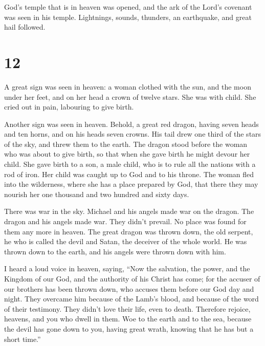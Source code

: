  God's temple that is in heaven was opened, and the ark
of the Lord's covenant was seen in his temple. Lightnings, sounds,
thunders, an earthquake, and great hail followed.

\hypertarget{section-11}{%
\section{12}\label{section-11}}

 A great sign was seen in heaven: a woman clothed with the
sun, and the moon under her feet, and on her head a crown of twelve
stars.  She was with child. She cried out in pain,
labouring to give birth.

 Another sign was seen in heaven. Behold, a great red
dragon, having seven heads and ten horns, and on his heads seven crowns.
 His tail drew one third of the stars of the sky, and
threw them to the earth. The dragon stood before the woman who was about
to give birth, so that when she gave birth he might devour her child.
 She gave birth to a son, a male child, who is to rule all
the nations with a rod of iron. Her child was caught up to God and to
his throne.  The woman fled into the wilderness, where she
has a place prepared by God, that there they may nourish her one
thousand and two hundred and sixty days.

 There was war in the sky. Michael and his angels made war
on the dragon. The dragon and his angels made war.  They
didn't prevail. No place was found for them any more in heaven.
 The great dragon was thrown down, the old serpent, he who
is called the devil and Satan, the deceiver of the whole world. He was
thrown down to the earth, and his angels were thrown down with him.

 I heard a loud voice in heaven, saying, ``Now the
salvation, the power, and the Kingdom of our God, and the authority of
his Christ has come; for the accuser of our brothers has been thrown
down, who accuses them before our God day and night. 
They overcame him because of the Lamb's blood, and because of the word
of their testimony. They didn't love their life, even to death.
 Therefore rejoice, heavens, and you who dwell in them.
Woe to the earth and to the sea, because the devil has gone down to you,
having great wrath, knowing that he has but a short time.''

